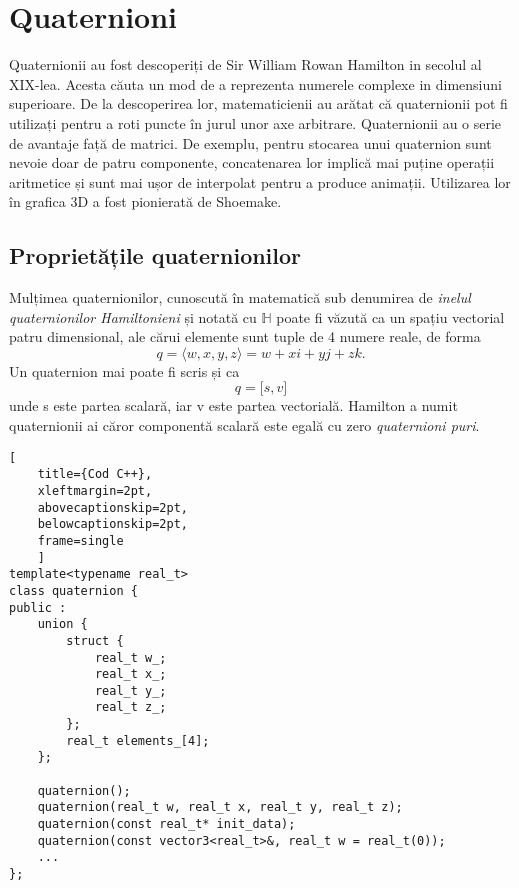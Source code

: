 \section{Quaternioni}
\label{ch1:quaternions}
\indent

Quaternionii au fost descoperiți de Sir William Rowan Hamilton in secolul al
XIX-lea. Acesta căuta un mod de a reprezenta numerele complexe in dimensiuni
superioare. De la descoperirea lor, matematicienii au arătat că quaternionii pot
fi utilizați pentru a roti puncte în jurul unor axe arbitrare.
Quaternionii au o serie de avantaje față de matrici. De exemplu, pentru
stocarea unui quaternion sunt nevoie doar de patru componente, concatenarea lor
implică mai puține operații aritmetice și sunt mai ușor de interpolat pentru a
produce animații. Utilizarea lor în grafica 3D a fost pionierată de Shoemake.

\subsection{Proprietățile quaternionilor}
\label{ch1:quaternions:properties}
\indent

Mulțimea quaternionilor, cunoscută în matematică sub denumirea de \textit{inelul
quaternionilor Hamiltonieni} și notată cu $\mathbb{H}$ poate fi văzută ca
un spațiu vectorial patru dimensional, ale cărui elemente sunt tuple de 4
numere reale, de forma 
\begin{equation}
q = \langle w, x, y, z\rangle = w + x\mathit{i} + y\mathit{j} + z\mathit{k}.
\end{equation}
Un quaternion mai poate fi scris și ca 
\begin{equation}
q = \lbrack s, v \rbrack
\end{equation} unde s este partea scalară, iar v este partea vectorială.
Hamilton a numit quaternionii ai căror componentă scalară este egală cu zero
\textit{quaternioni puri}.
\begin{lstlisting}[
    title={Cod C++}, 
    xleftmargin=2pt,
    abovecaptionskip=2pt,
    belowcaptionskip=2pt,
    frame=single
    ]
template<typename real_t>
class quaternion {
public :
    union {
        struct {
            real_t w_;
            real_t x_;
            real_t y_;
            real_t z_;
        };
        real_t elements_[4];
    };

    quaternion();
    quaternion(real_t w, real_t x, real_t y, real_t z);
    quaternion(const real_t* init_data);
    quaternion(const vector3<real_t>&, real_t w = real_t(0));
    ...
};
\end{lstlisting}

